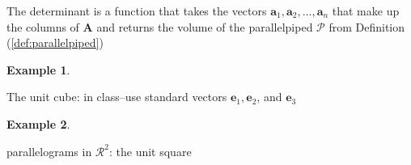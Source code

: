 \documentclass[
]{book}
\theoremstyle{definition}
\theoremstyle{definition}
\newtheorem{example}{Example}[chapter]
\theoremstyle{definition}
\theoremstyle{remark}
\begin{document}
The determinant is a function that takes the vectors \(\mathbf{a}_1, \mathbf{a}_2, \ldots, \mathbf{a}_n\) that make up the columns of \(\mathbf{A}\) and returns the volume of the parallelpiped \(\mathcal{P}\) from Definition (\ref{def:parallelpiped})

\begin{example}
\protect\hypertarget{exm:unlabeled-div-110}{}\label{exm:unlabeled-div-110}

The unit cube: in class--use standard vectors \(\mathbf{e}_1, \mathbf{e}_2\), and \(\mathbf{e}_3\)

\end{example}

\begin{example}
\protect\hypertarget{exm:unlabeled-div-111}{}\label{exm:unlabeled-div-111}

parallelograms in \(\mathcal{R}^2\): the unit square


\end{example}
\end{document}
